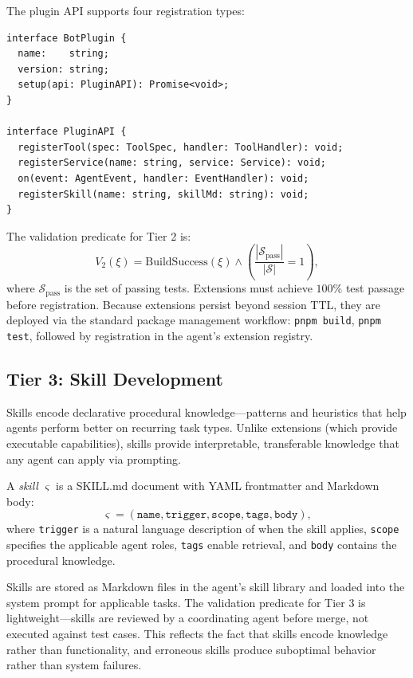 The plugin API supports four registration types:

\begin{verbatim}
interface BotPlugin {
  name:    string;
  version: string;
  setup(api: PluginAPI): Promise<void>;
}

interface PluginAPI {
  registerTool(spec: ToolSpec, handler: ToolHandler): void;
  registerService(name: string, service: Service): void;
  on(event: AgentEvent, handler: EventHandler): void;
  registerSkill(name: string, skillMd: string): void;
}
\end{verbatim}

The validation predicate for Tier 2 is:
\begin{equation}
    V_2(\xi) = \text{BuildSuccess}(\xi) \wedge \left(\frac{|\mathcal{S}_{\text{pass}}|}{|\mathcal{S}|} = 1\right),
\end{equation}
where $\mathcal{S}_{\text{pass}}$ is the set of passing tests. Extensions must
achieve $100\%$ test passage before registration. Because extensions persist
beyond session TTL, they are deployed via the standard package management
workflow: \texttt{pnpm build}, \texttt{pnpm test}, followed by registration in
the agent's extension registry.

\subsection{Tier 3: Skill Development}
\label{sec:tier3}

Skills encode declarative procedural knowledge---patterns and heuristics that
help agents perform better on recurring task types. Unlike extensions (which
provide executable capabilities), skills provide interpretable, transferable
knowledge that any agent can apply via prompting.

\begin{definition}[Skill]
A \emph{skill} $\varsigma$ is a SKILL.md document with YAML frontmatter and
Markdown body:
\begin{equation}
    \varsigma = \left(\texttt{name}, \texttt{trigger}, \texttt{scope},
    \texttt{tags}, \texttt{body}\right),
\end{equation}
where \texttt{trigger} is a natural language description of when the skill
applies, \texttt{scope} specifies the applicable agent roles, \texttt{tags}
enable retrieval, and \texttt{body} contains the procedural knowledge.
\end{definition}

Skills are stored as Markdown files in the agent's skill library and loaded
into the system prompt for applicable tasks. The validation predicate for Tier 3
is lightweight---skills are reviewed by a coordinating agent before merge, not
executed against test cases. This reflects the fact that skills encode knowledge
rather than functionality, and erroneous skills produce suboptimal behavior
rather than system failures.

